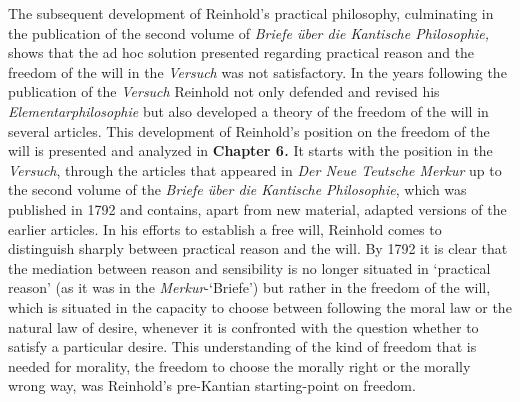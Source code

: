 The subsequent development of Reinhold's practical philosophy, culminating in the publication of the second volume of \textit{Briefe \"{u}ber die Kantische Philosophie, }shows that the ad hoc solution presented regarding practical reason and the freedom of the will in the \textit{Versuch} was not satisfactory. In the years following the publication of the \textit{Versuch }Reinhold not only defended and revised his \textit{Elementarphilosophie }but also developed a theory of the freedom of the will in several articles. This development of Reinhold's position on the freedom of the will is presented and analyzed in \textbf{Chapter 6\textit{.}} It starts with the position in the \textit{Versuch}, through the articles that appeared in \textit{Der Neue Teutsche Merkur} up to the second volume of the \textit{Briefe \"{u}ber die Kantische Philosophie}, which was published in 1792 and contains, apart from new material, adapted versions of the earlier articles. In his efforts to establish a free will, Reinhold comes to distinguish sharply between practical reason and the will. By 1792 it is clear that the mediation between reason and sensibility is no longer situated in `practical reason' (as it was in the \textit{Merkur}{-}`Briefe') but rather in the freedom of the will, which is situated in the capacity to choose between following the moral law or the natural law of desire, whenever it is confronted with the question whether to satisfy a particular desire. This understanding of the kind of freedom that is needed for morality, the freedom to choose the morally right or the morally wrong way, was Reinhold's pre{-}Kantian starting{-}point on freedom.

